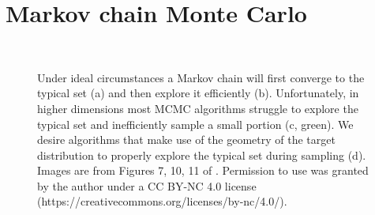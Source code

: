 \section{Markov chain Monte Carlo}

\begin{figure}
	 \\
	\caption{Under ideal circumstances a Markov chain will first converge to the typical set (a) and then explore it efficiently (b). Unfortunately, in higher dimensions most MCMC algorithms struggle to explore the typical set and inefficiently sample a small portion (c, green). We desire algorithms that make use of the geometry of the target distribution to properly explore the typical set during sampling (d). Images are from Figures 7, 10, 11 of \cite{Betancourt2017}. Permission to use was granted by the author under a CC BY-NC 4.0 license (https://creativecommons.org/licenses/by-nc/4.0/).}
	\label{fig:mcmc}
\end{figure}

